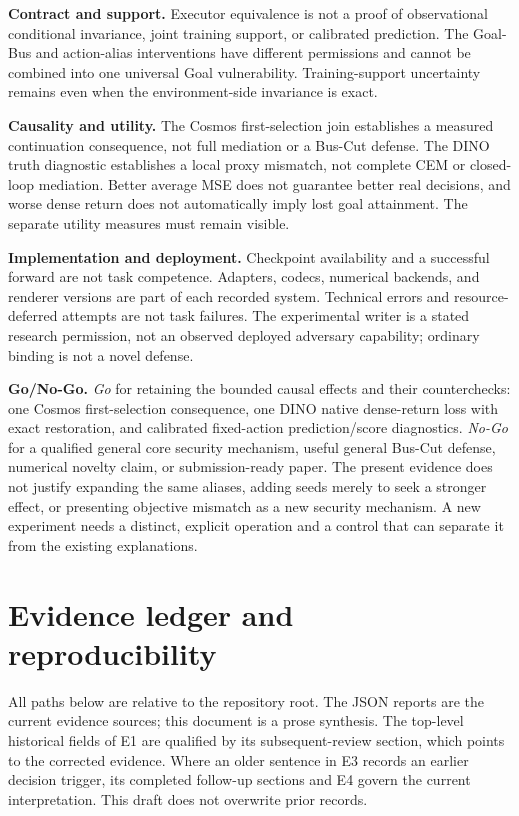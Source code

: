 \documentclass[11pt]{article}
\begin{document}
\textbf{Contract and support.}
Executor equivalence is not a proof of observational conditional invariance,
joint training support, or calibrated prediction. The Goal-Bus and action-alias
interventions have different permissions and cannot be combined into one
universal Goal vulnerability. Training-support uncertainty remains even when
the environment-side invariance is exact.

\textbf{Causality and utility.}
The Cosmos first-selection join establishes a measured continuation consequence,
not full mediation or a Bus-Cut defense. The DINO truth diagnostic establishes
a local proxy mismatch, not complete CEM or closed-loop mediation. Better average
MSE does not guarantee better real decisions, and worse dense return does not
automatically imply lost goal attainment. The separate utility measures must
remain visible.

\textbf{Implementation and deployment.}
Checkpoint availability and a successful forward are not task competence.
Adapters, codecs, numerical backends, and renderer versions are part of each
recorded system. Technical errors and resource-deferred attempts are not task
failures. The experimental writer is a stated research permission, not an
observed deployed adversary capability; ordinary binding is not a novel defense.

\textbf{Go/No-Go.}
\emph{Go} for retaining the bounded causal effects and their counterchecks:
one Cosmos first-selection consequence, one DINO native dense-return loss with
exact restoration, and calibrated fixed-action prediction/score diagnostics.
\emph{No-Go} for a qualified general core security mechanism, useful general
Bus-Cut defense, numerical novelty claim, or submission-ready paper. The present
evidence does not justify expanding the same aliases, adding seeds merely to
seek a stronger effect, or presenting objective mismatch as a new security
mechanism. A new experiment needs a distinct, explicit operation and a control
that can separate it from the existing explanations.

\section{Evidence ledger and reproducibility}
\label{sec:repro}

All paths below are relative to the repository root. The JSON reports are the
current evidence sources; this document is a prose synthesis. The top-level
historical fields of E1 are qualified by its subsequent-review section, which
points to the corrected evidence. Where an older sentence in E3 records an
earlier decision trigger, its completed follow-up sections and E4 govern the
current interpretation. This draft does not overwrite prior records.
\end{document}

